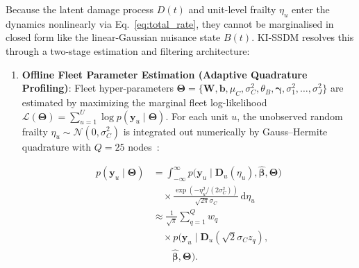 \documentclass[a4paper,fleqn]{cas-dc}
\begin{document}
Because the latent damage process $D(t)$ and unit-level frailty $\eta_u$ enter the dynamics nonlinearly via Eq.~\eqref{eq:total_rate}, they cannot be marginalised in closed form like the linear-Gaussian nuisance state $B(t)$. KI-SSDM resolves this through a two-stage estimation and filtering architecture:
\begin{enumerate}[label=\textbf{Stage \arabic*:},leftmargin=3.0em]
    \item \textbf{Offline Fleet Parameter Estimation (Adaptive Quadrature Profiling)}: Fleet hyper-parameters $\boldsymbol{\Theta} = \{\mathbf{W}, \mathbf{b}, \mu_C, \sigma_C^2, \theta_B, \boldsymbol{\gamma}, \sigma_1^2, \dots, \sigma_J^2\}$ are estimated by maximizing the marginal fleet log-likelihood $\mathcal{L}(\boldsymbol{\Theta}) = \sum_{u=1}^U \log p(\mathbf{y}_u \mid \boldsymbol{\Theta})$. For each unit $u$, the unobserved random frailty $\eta_u \sim \mathcal{N}(0, \sigma_C^2)$ is integrated out numerically by Gauss--Hermite quadrature with $Q = 25$ nodes~\cite{Yan_2021, N_Zhang_2024}:
    
\begin{equation}
\label{eq:quadrature_marginal}
\begin{aligned}
p(\mathbf{y}_u \mid \boldsymbol{\Theta})
&= \int_{-\infty}^{\infty}
p\bigl(\mathbf{y}_u \mid
\mathbf{D}_u(\eta_u),
\hat{\boldsymbol{\beta}},
\boldsymbol{\Theta}\bigr)\\
&\quad \times
\frac{\exp\!\left(
-\eta_u^2/(2\sigma_C^2)
\right)}
{\sqrt{2\pi}\sigma_C}
\,\mathrm{d}\eta_u\\[2pt]
&\approx \frac{1}{\sqrt{\pi}}
\sum_{q=1}^{Q} w_q\\
&\quad \times
p\bigl(\mathbf{y}_u \mid
\mathbf{D}_u(\sqrt{2}\sigma_C z_q),\\
&\qquad
\hat{\boldsymbol{\beta}},
\boldsymbol{\Theta}\bigr).
\end{aligned}
\end{equation}


\end{enumerate}
\end{document}
